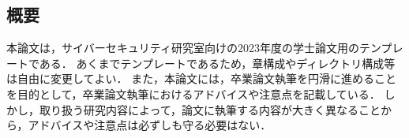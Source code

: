 \begin{center}
    \subsection*{概要}
\end{center}

本論文は，サイバーセキュリティ研究室向けの2023年度の学士論文用のテンプレートである．
あくまでテンプレートであるため，章構成やディレクトリ構成等は自由に変更してよい．
また，本論文には，卒業論文執筆を円滑に進めることを目的として，卒業論文執筆におけるアドバイスや注意点を記載している．
しかし，取り扱う研究内容によって，論文に執筆する内容が大きく異なることから，アドバイスや注意点は必ずしも守る必要はない．

